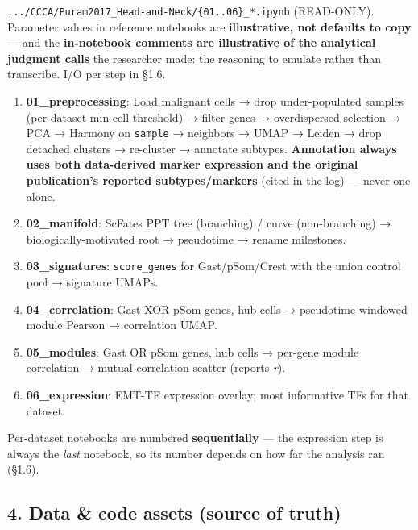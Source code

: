\documentclass[11pt,a4paper]{article}
\providecommand{\tightlist}{\setlength{\itemsep}{0pt}\setlength{\parskip}{0pt}}
\begin{document}
\texttt{.../CCCA/Puram2017\_Head-and-Neck/\{01..06\}\_*.ipynb}
(READ-ONLY). Parameter values in reference notebooks are
\textbf{illustrative, not defaults to copy} --- and the
\textbf{in-notebook comments are illustrative of the analytical judgment
calls} the researcher made: the reasoning to emulate rather than
transcribe. I/O per step in §1.6.

\begin{enumerate}
\def\labelenumi{\arabic{enumi}.}
\tightlist
\item
  \textbf{01\_preprocessing}: Load malignant cells → drop
  under-populated samples (per-dataset min-cell threshold) → filter
  genes → overdispersed selection → PCA → Harmony on \texttt{sample} →
  neighbors → UMAP → Leiden → drop detached clusters → re-cluster →
  annotate subtypes. \textbf{Annotation always uses both data-derived
  marker expression and the original publication's reported
  subtypes/markers} (cited in the log) --- never one alone.
\item
  \textbf{02\_manifold}: ScFates PPT tree (branching) / curve
  (non-branching) → biologically-motivated root → pseudotime → rename
  milestones.
\item
  \textbf{03\_signatures}: \texttt{score\_genes} for Gast/pSom/Crest
  with the union control pool → signature UMAPs.
\item
  \textbf{04\_correlation}: Gast XOR pSom genes, hub cells →
  pseudotime-windowed module Pearson → correlation UMAP.
\item
  \textbf{05\_modules}: Gast OR pSom genes, hub cells → per-gene
  module correlation → mutual-correlation scatter (reports \emph{r}).
\item
  \textbf{06\_expression}: EMT-TF expression overlay; most
  informative TFs for that dataset.
\end{enumerate}

Per-dataset notebooks are numbered \textbf{sequentially} --- the
expression step is always the \emph{last} notebook, so its number
depends on how far the analysis ran (§1.6).

\hypertarget{data-code-assets-source-of-truth}{%
\subsection{4. Data \& code assets (source of truth)}\label{data-code-assets-source-of-truth}}
\end{document}
